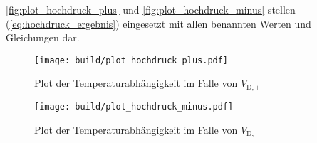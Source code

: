 \autoref{fig:plot_hochdruck_plus} und \autoref{fig:plot_hochdruck_minus} stellen (\ref{eq:hochdruck_ergebnis}) eingesetzt mit allen benannten Werten und Gleichungen dar.

\begin{figure}
    \centering
    \texttt{[image: build/plot\_hochdruck\_plus.pdf]}
    \caption{Plot der Temperaturabhängigkeit im Falle von $V_{\text{D},+}$}
    \label{fig:plot_hochdruck_plus}
\end{figure}

\begin{figure}
    \centering
    \texttt{[image: build/plot\_hochdruck\_minus.pdf]}
    \caption{Plot der Temperaturabhängigkeit im Falle von $V_{\text{D},-}$}
    \label{fig:plot_hochdruck_minus}
\end{figure}